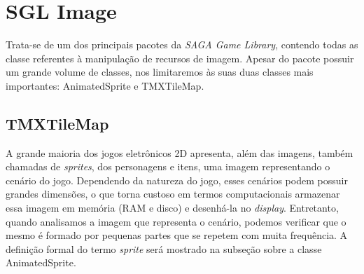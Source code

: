 \section{SGL Image}
%
Trata-se de um dos principais pacotes da \textit{SAGA Game Library}, contendo todas as classe referentes à manipulação de recursos de imagem. Apesar do pacote possuir um grande volume de classes, nos limitaremos às suas duas classes mais importantes: AnimatedSprite e TMXTileMap.
%
%
%
\subsection{TMXTileMap}
%
%
%
A grande maioria dos jogos eletrônicos 2D apresenta, além das imagens, também chamadas de \textit{sprites}, dos personagens e itens, uma imagem representando o cenário do jogo. Dependendo da natureza do jogo, esses cenários podem possuir grandes dimensões, o que torna custoso em termos computacionais armazenar essa imagem em memória (RAM e disco) e desenhá-la no \textit{display}. Entretanto, quando analisamos a imagem que representa o cenário, podemos verificar que o mesmo é formado por pequenas partes que se repetem com muita frequência. A definição formal do termo \textit{sprite} será mostrado na subseção sobre a classe AnimatedSprite.

